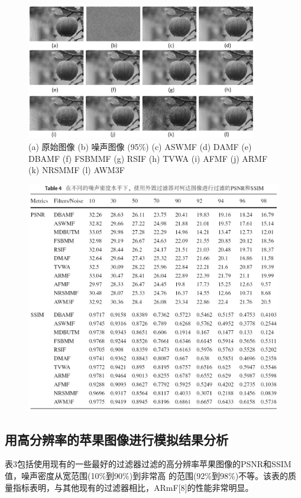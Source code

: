 \documentclass[12pt]{article} %
\begin{document}
\begin{figure}[H]
    \centering
    \includegraphics[width=0.9\textwidth]{images/09.eps}
    \caption{(a) 原始图像 (b) 噪声图像 (95\%) (c) ASWMF (d) DAMF (e) DBAMF (f) FSBMMF (g) RSIF (h) TVWA (i) AFMF (j) ARMF (k) NRSMMF (l) AWM3F}
\end{figure}

\begin{figure}[H]
    \centering
    \includegraphics[width=1\textwidth]{images/10.eps}
\end{figure}

\subsection{用高分辨率的苹果图像进行模拟结果分析}
表3包括使用现有的一些最好的过滤器过滤的高分辨率苹果图像的PSNR和SSIM值，噪声密度从宽范围(10\%到90\%)到非常高
的范围(92\%到98\%)不等。该表的质量指标表明，与其他现有的过滤器相比，ARmF[8]的性能非常明显。
\end{document}
